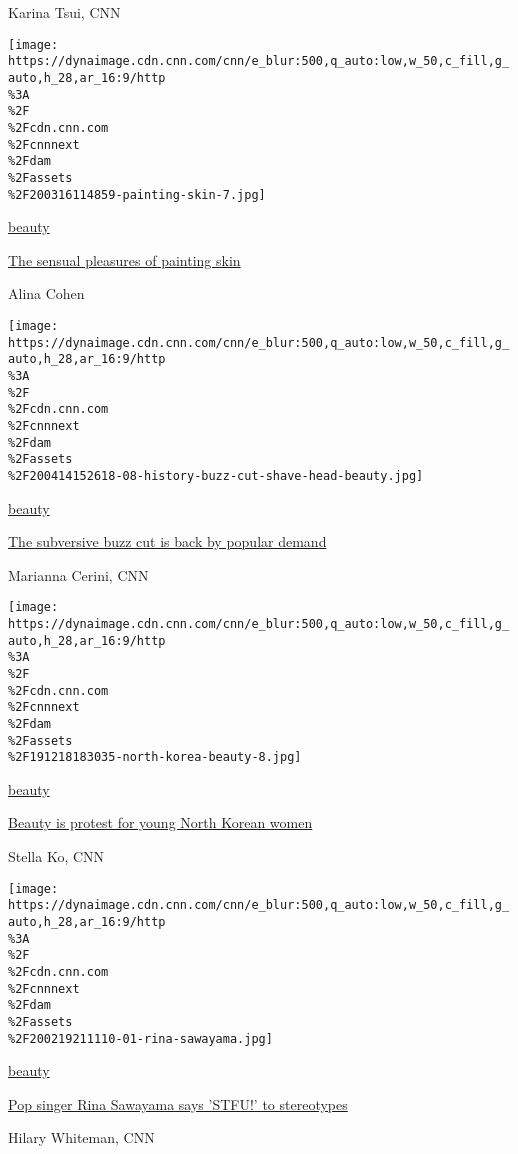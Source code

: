 Karina Tsui, CNN

\href{/style/article/pleasure-of-painting-skin-artsy/index.html}{}

\texttt{[image: https://dynaimage.cdn.cnn.com/cnn/e\_blur:500,q\_auto:low,w\_50,c\_fill,g\_auto,h\_28,ar\_16:9/http\\\%3A\\\%2F\\\%2Fcdn.cnn.com\\\%2Fcnnnext\\\%2Fdam\\\%2Fassets\\\%2F200316114859-painting-skin-7.jpg]}

\href{/style/beauty}{beauty}

\href{/style/article/pleasure-of-painting-skin-artsy/index.html}{The
sensual pleasures of painting skin}

Alina Cohen

\href{/style/article/buzz-cuts-how-to-at-home-style-history/index.html}{}

\texttt{[image: https://dynaimage.cdn.cnn.com/cnn/e\_blur:500,q\_auto:low,w\_50,c\_fill,g\_auto,h\_28,ar\_16:9/http\\\%3A\\\%2F\\\%2Fcdn.cnn.com\\\%2Fcnnnext\\\%2Fdam\\\%2Fassets\\\%2F200414152618-08-history-buzz-cut-shave-head-beauty.jpg]}

\href{/style/beauty}{beauty}

\href{/style/article/buzz-cuts-how-to-at-home-style-history/index.html}{The
subversive buzz cut is back by popular demand}

Marianna Cerini, CNN

\href{/style/article/north-korea-womens-beauty-freedom/index.html}{}

\texttt{[image: https://dynaimage.cdn.cnn.com/cnn/e\_blur:500,q\_auto:low,w\_50,c\_fill,g\_auto,h\_28,ar\_16:9/http\\\%3A\\\%2F\\\%2Fcdn.cnn.com\\\%2Fcnnnext\\\%2Fdam\\\%2Fassets\\\%2F191218183035-north-korea-beauty-8.jpg]}

\href{/style/beauty}{beauty}

\href{/style/article/north-korea-womens-beauty-freedom/index.html}{Beauty
is protest for young North Korean women}

Stella Ko, CNN

\href{/style/article/rina-sawayama-beauty/index.html}{}

\texttt{[image: https://dynaimage.cdn.cnn.com/cnn/e\_blur:500,q\_auto:low,w\_50,c\_fill,g\_auto,h\_28,ar\_16:9/http\\\%3A\\\%2F\\\%2Fcdn.cnn.com\\\%2Fcnnnext\\\%2Fdam\\\%2Fassets\\\%2F200219211110-01-rina-sawayama.jpg]}

\href{/style/beauty}{beauty}

\href{/style/article/rina-sawayama-beauty/index.html}{Pop singer Rina
Sawayama says 'STFU!' to stereotypes}

Hilary Whiteman, CNN

